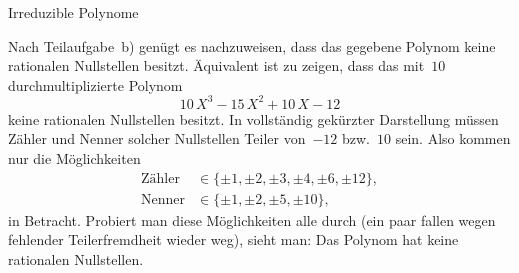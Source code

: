 \documentclass{algblatt}
\begin{document}
\begin{aufgabe}{Irreduzible Polynome}
\begin{loesungE}
\item Nach Teilaufgabe~b) genügt es nachzuweisen, dass das gegebene Polynom
keine rationalen Nullstellen besitzt. Äquivalent ist zu zeigen, dass das
mit~$10$ durchmultiplizierte Polynom
\[ 10 \, X^3 - 15 \, X^2 + 10 \, X - 12 \]
keine rationalen Nullstellen besitzt. In vollständig gekürzter Darstellung
müssen Zähler und Nenner solcher Nullstellen Teiler von~$-12$ bzw.~$10$ sein.
Also kommen nur die Möglichkeiten
\begin{align*}
  \text{Zähler} &\in \{ \pm 1, \pm 2, \pm 3, \pm 4, \pm 6, \pm 12 \}, \\
  \text{Nenner} &\in \{ \pm 1, \pm 2, \pm 5, \pm 10 \},
\end{align*}
in Betracht. Probiert man diese Möglichkeiten alle durch (ein paar fallen
wegen fehlender Teilerfremdheit wieder weg), sieht man: Das Polynom hat keine
rationalen Nullstellen.
\end{loesungE}
\end{aufgabe}
\end{document}
